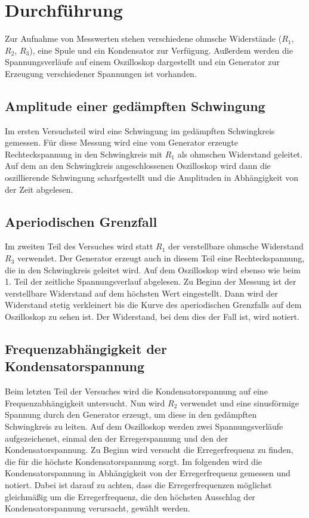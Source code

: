 \section{Durchführung}
\label{sec:Durchführung}
Zur Aufnahme von Messwerten stehen verschiedene ohmsche Widerstände ($R_1$, $R_2$, $R_3$),
 eine Spule und ein Kondensator zur Verfügung. Außerdem werden die Spannungsverläufe 
 auf einem Oszilloskop dargestellt und ein Generator zur Erzeugung verschiedener 
 Spannungen ist vorhanden. 
\subsection{Amplitude einer gedämpften Schwingung}
Im ersten Versuchsteil wird eine Schwingung im gedämpften Schwingkreis gemessen. Für
diese Messung wird eine vom Generator erzeugte Rechteckspannung in den Schwingkreis 
mit $R_1$ als ohmschen Widerstand geleitet. Auf dem an den Schwingkreis angeschlossenen
Oszilloskop wird dann die oszillierende Schwingung scharfgestellt und die 
Amplituden in Abhängigkeit von der Zeit abgelesen. 
\subsection{Aperiodischen Grenzfall}
Im zweiten Teil des Versuches wird statt $R_1$ der verstellbare ohmsche Widerstand $R_3$
verwendet. Der Generator erzeugt auch in diesem Teil eine Rechteckspannung, die in den 
Schwingkreis geleitet wird. Auf dem Oszilloskop wird ebenso wie beim 1. Teil der zeitliche
Spannungsverlauf abgelesen. Zu Beginn der Messung ist der verstellbare Widerstand auf 
dem höchsten Wert eingestellt. Dann wird der Widerstand stetig verkleinert bis die Kurve
des aperiodischen Grenzfalls auf dem Oszilloskop zu sehen ist. Der Widerstand, bei dem 
dies der Fall ist, wird notiert. 
\subsection{Frequenzabhängigkeit der Kondensatorspannung}
Beim letzten Teil der Versuches wird die Kondensatorspannung auf eine Frequenzabhängigkeit 
untersucht. Nun wird $R_2$ verwendet und eine sinusförmige Spannung durch den Generator
erzeugt, um diese in den gedämpften Schwingkreis zu leiten. Auf dem Oszilloskop werden
zwei Spannungsverläufe aufgezeichenet, einmal den der Erregerspannung und den der 
Kondensatorspannung. Zu Beginn wird versucht die Erregerfrequenz zu finden, die für die 
höchste Kondensatorspannung sorgt. Im folgenden wird die Kondensatorspannung 
in Abhängigkeit von der Erregerfrequenz gemessen und notiert. Dabei ist darauf zu achten, 
dass die Erregerfrequenzen möglichst gleichmäßig um die Erregerfrequenz, die den 
höchsten Ausschlag der Kondensatorspannung verursacht, gewählt werden. 